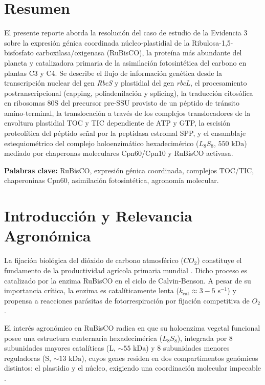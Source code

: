 \documentclass[12pt,spanish,letterpaper,oneside]{article}
\begin{document}
\hypersetup{pageanchor=false}
\begingroup
\fontsize{14}{17}\selectfont
\renewcommand{\Huge}{\fontsize{14}{17}\selectfont\bfseries}
\renewcommand{\large}{\fontsize{14}{17}\selectfont}
\templatePortrait
\clearpage
\endgroup
\hypersetup{pageanchor=true}
\templatePagecfg
\singlespacing
\setlength{\tabcolsep}{8pt}
\renewcommand{\arraystretch}{1.18}

\section*{Resumen}
El presente reporte aborda la resolución del caso de estudio de la Evidencia 3 sobre la expresión génica coordinada núcleo-plastidial de la Ribulosa-1,5-bisfosfato carboxilasa/oxigenasa (RuBisCO), la proteína más abundante del planeta y catalizadora primaria de la asimilación fotosintética del carbono en plantas C3 y C4. Se describe el flujo de información genética desde la transcripción nuclear del gen \textit{RbcS} y plastidial del gen \textit{rbcL}, el procesamiento postranscripcional (capping, poliadenilación y splicing), la traducción citosólica en ribosomas 80S del precursor pre-SSU provisto de un péptido de tránsito amino-terminal, la translocación a través de los complejos translocadores de la envoltura plastidial TOC y TIC dependiente de ATP y GTP, la escisión proteolítica del péptido señal por la peptidasa estromal SPP, y el ensamblaje estequiométrico del complejo holoenzimático hexadecimérico ($L_8S_8$, $550\text{ kDa}$) mediado por chaperonas moleculares Cpn60/Cpn10 y RuBisCO activasa.

\vspace{0.4cm}
\noindent\textbf{Palabras clave:} RuBisCO, expresión génica coordinada, complejos TOC/TIC, chaperoninas Cpn60, asimilación fotosintética, agronomía molecular.

\section{Introducción y Relevancia Agronómica}
La fijación biológica del dióxido de carbono atmosférico ($CO_2$) constituye el fundamento de la productividad agrícola primaria mundial \parencite{taiz2015}. Dicho proceso es catalizado por la enzima RuBisCO en el ciclo de Calvin-Benson. A pesar de su importancia crítica, la enzima es catalíticamente lenta ($k_{\text{cat}} \approx 3-5\text{ s}^{-1}$) y propensa a reacciones parásitas de fotorrespiración por fijación competitiva de $O_2$ \parencite{alberts2015}.

El interés agronómico en RuBisCO radica en que su holoenzima vegetal funcional posee una estructura cuaternaria hexadecimérica ($L_8S_8$), integrada por 8 subunidades mayores catalíticas (L, $\sim 55\text{ kDa}$) y 8 subunidades menores reguladoras (S, $\sim 13\text{ kDa}$), cuyos genes residen en dos compartimentos genómicos distintos: el plastidio y el núcleo, exigiendo una coordinación molecular impecable \parencite{lodish2016}.
\end{document}
